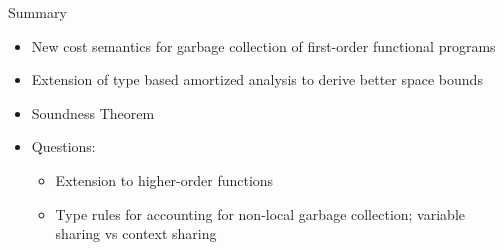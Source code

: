 \documentclass{beamer}
\newcounter{rule}
\theoremstyle{definition}
\begin{document}
\begin{frame}{Summary}
  \begin{itemize}
  \item New cost semantics for garbage collection of first-order functional programs
  \item Extension of type based amortized analysis to derive better space bounds
  \item Soundness Theorem
  \end{itemize}
  
  \begin{itemize}
  \item Questions:
    \begin{itemize}
    \item Extension to higher-order functions
    \item Type rules for accounting for non-local garbage collection;
      variable sharing vs context sharing
    \end{itemize}
  \end{itemize}
\end{frame}



\end{document}
